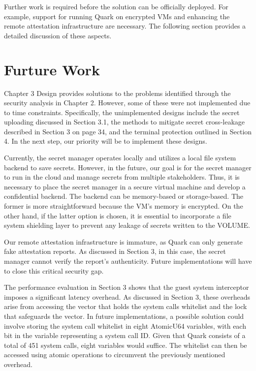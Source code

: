 Further work is required before the solution can be officially deployed. For example, support for running Quark on encrypted VMs and enhancing the remote attestation infrastructure are necessary. The following section provides a detailed discussion of these aspects.


\section{Furture Work}

Chapter 3 Design provides solutions to the problems identified through the security analysis in Chapter 2. However, some of these were not implemented due to time constraints. Specifically, the unimplemented designs include the secret uploading discussed in Section 3.1, the methods to mitigate secret cross-leakage described in Section 3 on page 34, and the terminal protection outlined in Section 4. In the next step, our priority will be to implement these designs.

Currently, the secret manager operates locally and utilizes a local file system backend to save secrets. However, in the future, our goal is for the secret manager to run in the cloud and manage secrets from multiple stakeholders. Thus, it is necessary to place the secret manager in a secure virtual machine and develop a confidential backend. The backend can be memory-based or storage-based. The former is more straightforward because the VM's memory is encrypted. On the other hand, if the latter option is chosen, it is essential to incorporate a file system shielding layer to prevent any leakage of secrets written to the VOLUME.

Our remote attestation infrastructure is immature, as Quark can only generate fake attestation reports. As discussed in Section 3, in this case, the secret manager cannot verify the report's authenticity. Future implementations will have to close this critical security gap.

The performance evaluation in Section 3 shows that the guest system interceptor imposes a significant latency overhead. As discussed in Section 3, these overheads arise from accessing the vector that holds the system calls whitelist and the lock that safeguards the vector. In future implementations, a possible solution could involve storing the system call whitelist in eight AtomicU64 variables, with each bit in the variable representing a system call ID. Given that Quark consists of a total of 451 system calls, eight variables would suffice. The whitelist can then be accessed using atomic operations to circumvent the previously mentioned overhead.

